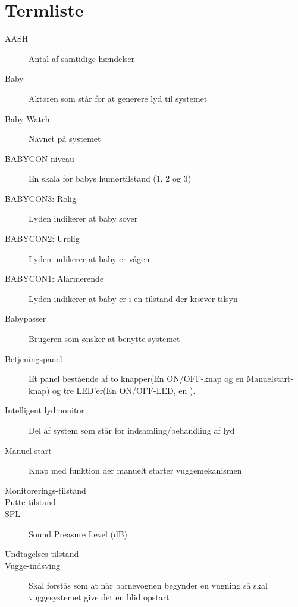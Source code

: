 \chapter{Termliste}


\begin{description}
\item[AASH] Antal af samtidige hændelser
\item[Baby] Aktøren som står for at generere lyd til systemet
\item[Baby Watch] Navnet på systemet
\item[BABYCON niveau] En skala for babys humørtilstand (1, 2 og 3)
\item[BABYCON3: Rolig] Lyden indikerer at baby sover
\item[BABYCON2: Urolig] Lyden indikerer at baby er vågen
\item[BABYCON1: Alarmerende] Lyden indikerer at baby er i en tilstand der kræver tilsyn
\item[Babypasser] Brugeren som ønsker at benytte systemet
\item[Betjeningspanel]Et panel bestående af to knapper(En ON/OFF-knap og en Manuelstart-knap) og tre LED'er(En ON/OFF-LED, en ). 
\item[Intelligent lydmonitor] Del af system som står for indsamling/behandling af lyd
\item[Manuel start] Knap med funktion der manuelt starter vuggemekanismen

\item[Monitorerings-tilstand] 
\item[Putte-tilstand]
\item[SPL] Sound Preasure Level (dB)
\item[Undtagelses-tilstand]
\item[Vugge-indsving] Skal forstås som at når barnevognen begynder en vugning så skal vuggesystemet give det en blid opstart





\end{description}